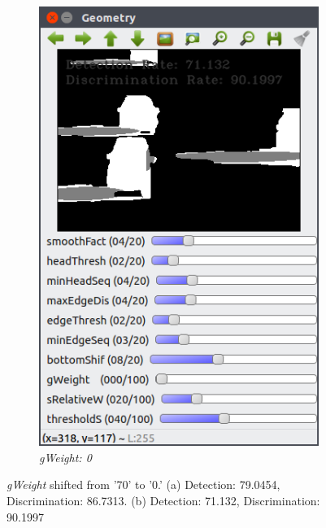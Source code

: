 \documentclass[12pt]{report}
\begin{document}
\begin{figure}
\begin{subfigure}{.49\linewidth}
    \includegraphics[width=1\linewidth]{figures/background/geo_lower_gweight.png}
    \caption{\textit{gWeight: 0}}
  \end{subfigure}
  \caption{\textit{gWeight} shifted from '70' to '0.' (a) Detection: 79.0454, Discrimination: 86.7313. (b) Detection: 71.132, Discrimination: 90.1997}
  \label{fig:gweight}
\end{figure}



\end{document}
